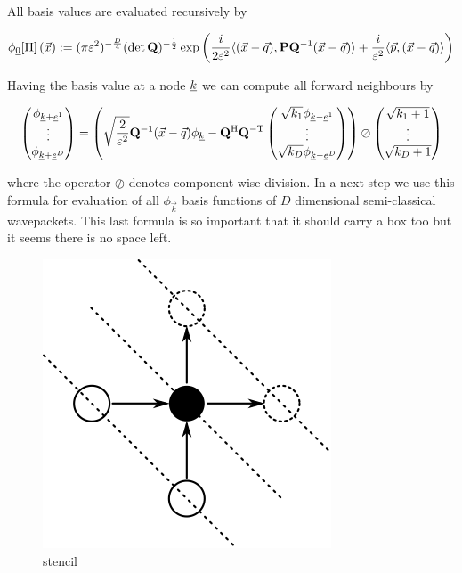 \documentclass{article}
\begin{document}
All basis values are evaluated recursively by

\begin{equation}
\label{eq:phi0_Dd}
  \phi_{\underline{0}}[\Pi]\left(\vec{x}\right)
  :=
  (\pi\varepsilon^2)^{-\frac{D}{4}} (\det\mathbf{Q})^{-\frac{1}{2}}
  \exp \left( \frac{i}{2\varepsilon^2}
  \langle (\vec{x}-\vec{q}) , \mathbf{P}\mathbf{Q}^\mathrm{-1}(\vec{x}-\vec{q}) \rangle
  + \frac{i}{\varepsilon^2} \langle \vec{p} , (\vec{x}-\vec{q}) \rangle
 \right)
\end{equation}

Having the basis value at a node $\underline{k}$ we can compute all forward
neighbours by

\begin{equation}
  \begin{pmatrix}
    \phi_{\underline{k}+\underline{e}^1} \\
    \vdots \\
    \phi_{\underline{k}+\underline{e}^D}
  \end{pmatrix}
  = \left(
  \sqrt{\frac{2}{\varepsilon^2}} \mathbf{Q}^\mathrm{-1} (\vec{x}-\vec{q}) \phi_{\underline{k}}
  - \mathbf{Q}^\mathrm{H} \mathbf{Q}^\mathrm{-T}
  \begin{pmatrix}
    \sqrt{k_1} \phi_{\underline{k}-\underline{e}^1} \\
    \vdots \\
    \sqrt{k_D} \phi_{\underline{k}-\underline{e}^D}
  \end{pmatrix}
  \right)
  \oslash
  \begin{pmatrix}
    \sqrt{k_1+1}\\
    \vdots \\
    \sqrt{k_D+1}
  \end{pmatrix}
\end{equation}

where the operator $\oslash$ denotes component-wise division. In a next step
we use this formula for evaluation of all $\phi_{\vec{k}}$ basis functions
of $D$ dimensional semi-classical wavepackets. This last formula is so important
that it should carry a box too but it seems there is no space left.

\begin{figure}[H]
    \centering
    \includegraphics[]{basis_eval_stencil}
    \caption{stencil}
\end{figure}
\end{document}
